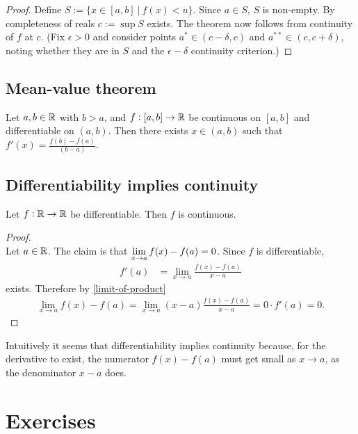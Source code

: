 \begin{proof}
  Define $S := \{x \in [a, b] ~|~ f(x) < u\}$. Since $a \in S$, $S$ is non-empty. By completeness
  of reals $c := \sup S$ exists. The theorem now follows from continuity of $f$ at $c$. (Fix
  $\epsilon > 0$ and consider points $a^* \in (c - \delta, c)$ and $a^{**} \in (c, c + \delta)$,
  noting whether they are in $S$ and the $\epsilon-\delta$ continuity criterion.)
\end{proof}


\subsection{Mean-value theorem}
\begin{theorem*}
  Let $a, b \in \mathbb{R}$ with $b > a$, and $f:[a,b] \to \mathbb{R}$ be continuous on $[a, b]$ and differentiable
  on $(a, b)$. Then there exists $x \in (a, b)$ such that $f'(x) = \frac{f(b) - f(a)}{(b - a)}$.
\end{theorem*}


\subsection{Differentiability implies continuity}
\begin{theorem*}
  Let $f:\mathbb{R}\to\mathbb{R}$ be differentiable. Then $f$ is continuous.
\end{theorem*}

\begin{proof}~\\
  Let $a \in \mathbb{R}$. The claim is that $\lim\limits_{x \to a} f(x) - f(a) = 0$. Since $f$ is differentiable,
  \begin{align*}
    f'(a) &= \lim_{x \to a} \frac{f(x) - f(a)}{x - a}
  \end{align*}
  exists. Therefore by \eqref{limit-of-product}
  \begin{align*}
    \lim_{x \to a} f(x) - f(a) = \lim_{x \to a} (x - a)\frac{f(x) - f(a)}{x - a} = 0\cdot f'(a) = 0.
  \end{align*}
\end{proof}

\begin{remark*}
  Intuitively it seems that differentiability implies continuity because, for the derivative to
  exist, the numerator $f(x) - f(a)$ must get small as $x\to a$, as the denominator $x - a$ does.
\end{remark*}


\newpage
\section{Exercises}

